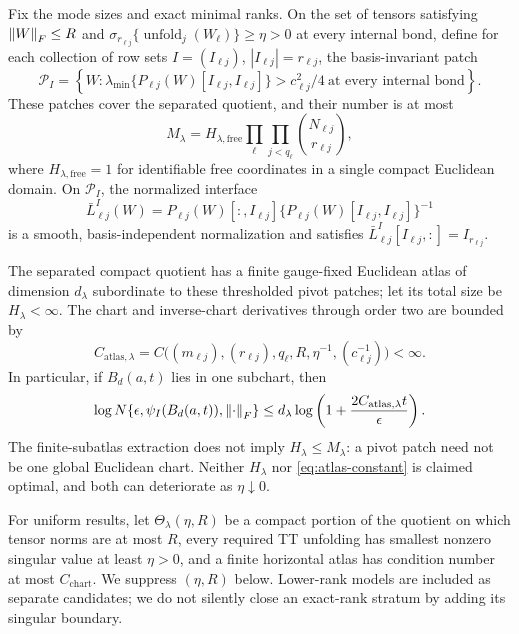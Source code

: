 \begin{proposition}
\label{prop:tt-atlas}
Fix the mode sizes and exact minimal ranks. On the set of tensors satisfying
\(\left\lVert W\right\rVert_F\le R\) and
\(\sigma_{r_{\ell j}}\{\operatorname{unfold}_j(W_\ell)\}\ge\eta>0\)
at every internal bond, define for each collection of row sets
\(I=(I_{\ell j})\), \(|I_{\ell j}|=r_{\ell j}\), the basis-invariant patch
\begin{equation}
 \mathcal P_I=\left\{W:
 \lambda_{\min}\{P_{\ell j}(W)[I_{\ell j},I_{\ell j}]\}
 >c_{\ell j}^2/4\ \text{at every internal bond}\right\}.
 \label{eq:pivot-patch}
\end{equation}
These patches cover the separated quotient, and their number is at most
\begin{equation}
 M_\lambda=H_{\lambda,\mathrm{free}}
 \prod_\ell\prod_{j<q_\ell}
 \binom{N_{\ell j}}{r_{\ell j}},
 \label{eq:pivot-count}
\end{equation}
where \(H_{\lambda,\mathrm{free}}=1\) for identifiable free coordinates in a
single compact Euclidean domain. On \(\mathcal P_I\), the normalized interface
\[
 \bar L_{\ell j}^{I}(W)=P_{\ell j}(W)[:,I_{\ell j}]
 \{P_{\ell j}(W)[I_{\ell j},I_{\ell j}]\}^{-1}
\]
is a smooth, basis-independent normalization and satisfies
\(\bar L_{\ell j}^{I}[I_{\ell j},:]=I_{r_{\ell j}}\).

The separated compact quotient has a finite gauge-fixed Euclidean atlas of
dimension \(d_\lambda\) subordinate to these thresholded pivot patches; let
its total size be \(H_\lambda<\infty\). The chart and inverse-chart
derivatives through order two are bounded by
\begin{equation}
 C_{\mathrm{atlas},\lambda}
 =C\bigl((m_{\ell j}),(r_{\ell j}),q_\ell,R,\eta^{-1},
 (c_{\ell j}^{-1})\bigr)<\infty.
 \label{eq:atlas-constant}
\end{equation}
In particular, if \(B_d(a,t)\) lies in one subchart, then
\[
 \log N\{\epsilon,\psi_I(B_d(a,t)),\left\lVert \cdot\right\rVert_F\}
 \le d_\lambda\log\left(1+\frac{2C_{\mathrm{atlas},\lambda}t}{\epsilon}\right).
\]
The finite-subatlas extraction does not imply \(H_\lambda\le M_\lambda\): a
pivot patch need not be one global Euclidean chart. Neither \(H_\lambda\) nor
\cref{eq:atlas-constant} is claimed optimal, and both can deteriorate as
\(\eta\downarrow0\).
\end{proposition}

For uniform results, let \(\Theta_\lambda(\eta,R)\) be a compact portion of the quotient on which tensor norms are at most \(R\), every required TT unfolding has smallest nonzero singular value at least \(\eta>0\), and a finite horizontal atlas has condition number at most \(C_{\mathrm{chart}}\). We suppress \((\eta,R)\) below. Lower-rank models are included as separate candidates; we do not silently close an exact-rank stratum by adding its singular boundary.

